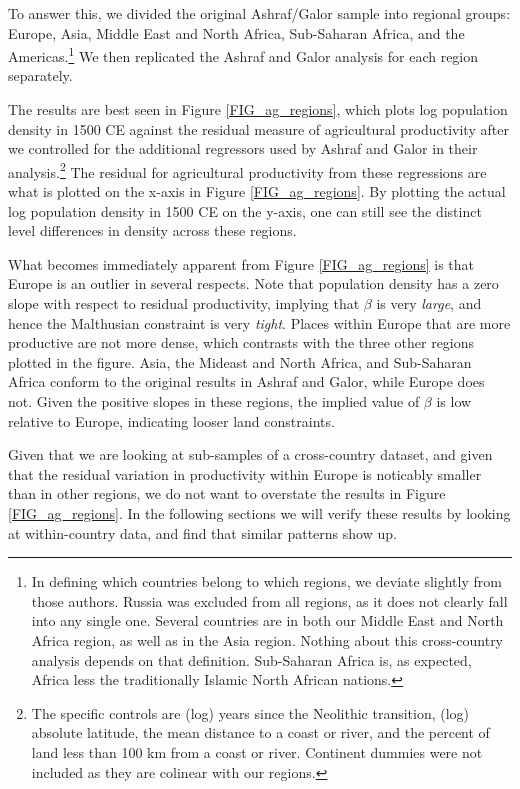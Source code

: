 \documentclass[11pt]{article}
\begin{document}
To answer this, we divided the original Ashraf/Galor sample into regional groups: Europe, Asia, Middle East and North Africa, Sub-Saharan Africa, and the Americas.\footnote{In defining which countries belong to which regions, we deviate slightly from those authors. Russia was excluded from all regions, as it does not clearly fall into any single one. Several countries are in both our Middle East and North Africa region, as well as in the Asia region. Nothing about this cross-country analysis depends on that definition. Sub-Saharan Africa is, as expected, Africa less the traditionally Islamic North African nations.} We then replicated the Ashraf and Galor analysis for each region separately.

The results are best seen in Figure \ref{FIG_ag_regions}, which plots log population density in 1500 CE against the residual measure of agricultural productivity after we controlled for the additional regressors used by Ashraf and Galor in their analysis.\footnote{The specific controls are (log) years since the Neolithic transition, (log) absolute latitude, the mean distance to a coast or river, and the percent of land less than 100 km from a coast or river. Continent dummies were not included as they are colinear with our regions.} The residual for agricultural productivity from these regressions are what is plotted on the x-axis in Figure \ref{FIG_ag_regions}. By plotting the actual log population density in 1500 CE on the y-axis, one can still see the distinct level differences in density across these regions.

What becomes immediately apparent from Figure \ref{FIG_ag_regions} is that Europe is an outlier in several respects. Note that population density has a zero slope with respect to residual productivity, implying that $\beta$ is very \textit{large}, and hence the Malthusian constraint is very \textit{tight}. Places within Europe that are more productive are not more dense, which contrasts with the three other regions plotted in the figure. Asia, the Mideast and North Africa, and Sub-Saharan Africa conform to the original results in Ashraf and Galor, while Europe does not. Given the positive slopes in these regions, the implied value of $\beta$ is low relative to Europe, indicating looser land constraints.

Given that we are looking at sub-samples of a cross-country dataset, and given that the residual variation in productivity within Europe is noticably smaller than in other regions, we do not want to overstate the results in Figure \ref{FIG_ag_regions}. In the following sections we will verify these results by looking at within-country data, and find that similar patterns show up.
\end{document}
